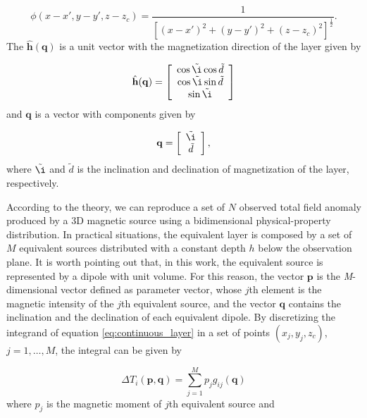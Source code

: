 \begin{equation}
   \phi (x-x', y-y', z-z_c) = \frac{1}{[(x-x')^2 + (y-y')^2 + (z-z_c)^2]^{\frac{1}{2}}} .
   \label{eq:phi}
 \end{equation}
The $\hat{\mathbf{h}}(\mathbf{q})$ is a unit vector with the magnetization direction of the layer given by 

\begin{equation}
	\hat{\mathbf{h}}(\mathbf{q}) =
	\left[ \begin{array}{c}
		\cos \tilde{\i} \cos \tilde{d} \\
		\cos \tilde{\i} \sin \tilde{d}\\
		\sin \tilde{\i}
	\end{array} \right] 
	\label{eq:mag_vec}
\end{equation}
and $\mathbf{q}$ is a vector with components given by 

 \begin{equation}
   \mathbf{q} =
   \left[ \begin{array}{c}
   \tilde{\i} \\ 
   \tilde{d} 
   \end{array} \right] ,
   \label{eq:q_vector}
 \end{equation}
where $\tilde{\i} $ and $\tilde{d} $ is the inclination and declination of magnetization of the layer, respectively.

According to the theory, we can reproduce a set of $N$ observed total field anomaly produced by a 3D magnetic source using a bidimensional physical-property distribution. In practical situations, the equivalent layer is composed by a set of $M$ equivalent sources distributed with a constant depth $h$ below the observation plane. It is worth pointing out that, in this work, the equivalent source is represented by a dipole with unit volume. For this reason, the vector $\mathbf{p}$ is the \textit{M}-dimensional vector defined as parameter vector, whose $j$th element is the magnetic intensity of the $j$th equivalent source, and the vector $\mathbf{q}$ contains the inclination and the declination of each equivalent dipole. By discretizing the integrand of equation \ref{eq:continuous_layer} in a set of points $(x_j,y_j,z_c)$, $j = 1, \ldots, M$, the integral can be given by

\begin{equation}
\Delta T_i (\mathbf{p},\mathbf{q})   = \sum_{j=1}^{M} p_j g_{ij} (\mathbf{q})
\label{eq:tfa_pred_pos_i}
\end{equation}    
where $p_j$ is the magnetic moment of $j$th equivalent source and 

